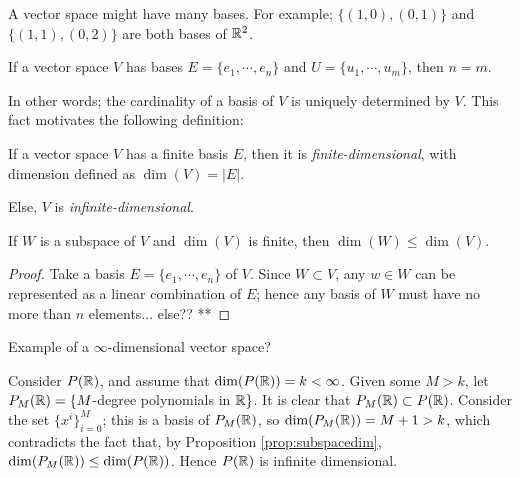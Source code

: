 \begin{remark*}
  A vector space might have many bases. For example; $\{(1,0),(0,1)\}$ and $\{(1,1),(0,2)\}$ are both bases of $\mathbb{R}^2$.
\end{remark*}

\begin{theorem}[Important]\label{thm:basedep}
  If a vector space $V$ has bases $E=\{e_1,\cdots, e_n\}$ and $U=\{u_1,\cdots, u_m\}$, then $n=m$.
\end{theorem}

In other words; the cardinality of a basis of $V$ is uniquely determined by $V$. This fact motivates the following definition:

\begin{definition}
  If a vector space $V$ has a finite basis $E$, then it is \emph{finite-dimensional}, with dimension defined as $\dim(V)=|E|$.

  Else, $V$ is \emph{infinite-dimensional}.
\end{definition}

\begin{proposition}\label{prop:subspacedim}
  If $W$ is a subspace of $V$ and $\dim(V)$ is finite, then $\dim(W)\leq\dim(V)$.
\end{proposition}
\begin{proof}
  Take a basis $E=\{e_1,\cdots,e_n\}$ of $V$. Since $W\subset V$, any $w\in W$ can be represented as a linear combination of $E$; hence any basis of $W$ must have no more than $n$ elements... else?? **
\end{proof}

\begin{question}
  Example of a $\infty$-dimensional vector space?
\end{question}
\begin{answer}
  Consider $P(\mathbb{R})$, and assume that $\dim(P(\mathbb{R}))=k<\infty$. Given some $M>k$, let $P_M(\mathbb{R})=\{M$-degree polynomials in $\mathbb{R}\}$. It is clear that $P_M(\mathbb{R})\subset P(\mathbb{R})$. Consider the set $\{x^i\}_{i=0}^M$; this is a basis of $P_M(\mathbb{R})$, so $\dim(P_M(\mathbb{R}))=M+1>k$, which contradicts the fact that, by Proposition \ref{prop:subspacedim}, $\dim(P_M(\mathbb{R}))\leq \dim(P(\mathbb{R}))$. Hence $P(\mathbb{R})$ is infinite dimensional.
\end{answer}

